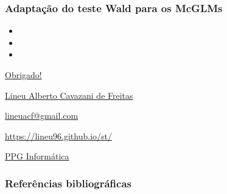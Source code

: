 \documentclass[10pt,
  aspectratio=169,
  serif,
  mathserif,
  professionalfont,
  compress,
  handout,
  ]{beamer}\usepackage[]{graphicx}\usepackage[]{color}
\begin{document}

\begin{frame}
  \frametitle{Adaptação do teste Wald para os McGLMs}

  \begin{itemize}
    \itemsep 2ex

  \item 
  
  \item 

  \item 

  \end{itemize}

\end{frame}


\begin{frame}[c, allowframebreaks]

\begin{center}

  {\huge \href{https://lineu96.github.io/st/}{Obrigado!}}
  
  \vspace{0.5cm}
    
  {\normalsize \href{https://lineu96.github.io/st/}{Lineu Alberto Cavazani de Freitas}}
  
  {\normalsize \href{https://lineu96.github.io/st/}{lineuacf@gmail.com}}
  
  {\normalsize \href{https://lineu96.github.io/st/}{https://lineu96.github.io/st/}}
  
  {\normalsize \href{http://www.prppg.ufpr.br/ppginformatica/?lang=pb}{PPG Informática}}


\begin{figure} %
\end{figure} %

\end{center}

\end{frame}


\begin{frame}[fragile]
  \frametitle{Referências bibliográficas}
  
  \begin{tiny}
    
  \end{tiny}
  
\end{frame}
\end{document}
